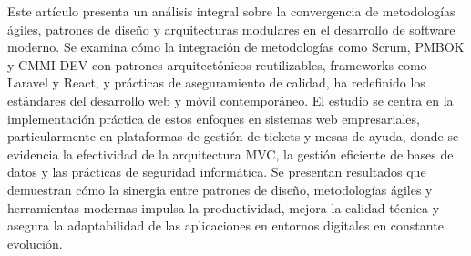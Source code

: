 Este artículo presenta un análisis integral sobre la convergencia de metodologías ágiles, patrones de diseño y arquitecturas modulares en el desarrollo de software moderno. Se examina cómo la integración de metodologías como Scrum, PMBOK y CMMI-DEV con patrones arquitectónicos reutilizables, frameworks como Laravel y React, y prácticas de aseguramiento de calidad, ha redefinido los estándares del desarrollo web y móvil contemporáneo. El estudio se centra en la implementación práctica de estos enfoques en sistemas web empresariales, particularmente en plataformas de gestión de tickets y mesas de ayuda, donde se evidencia la efectividad de la arquitectura MVC, la gestión eficiente de bases de datos y las prácticas de seguridad informática. Se presentan resultados que demuestran cómo la sinergia entre patrones de diseño, metodologías ágiles y herramientas modernas impulsa la productividad, mejora la calidad técnica y asegura la adaptabilidad de las aplicaciones en entornos digitales en constante evolución.